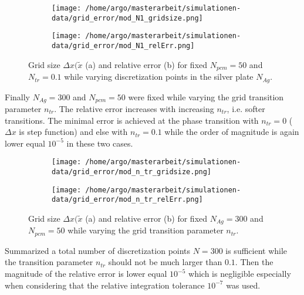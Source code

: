 \documentclass{scrartcl}[12pt, halfparskip]
\numberwithin{equation}{section}
\numberwithin{figure}{section}
\numberwithin{table}{section}
\begin{document}
\begin{figure}[H]
	\begin{subfigure}{0.49\textwidth}
		\texttt{[image: /home/argo/masterarbeit/simulationen-data/grid\_error/mod\_N1\_gridsize.png]}
		\caption{}
		\label{fig:gridsize_mod_N1}
	\end{subfigure}
	\begin{subfigure}{0.49\textwidth}
		\texttt{[image: /home/argo/masterarbeit/simulationen-data/grid\_error/mod\_N1\_relErr.png]}
		\caption{}
		\label{fig:grid_relErr_mod_N1}
	\end{subfigure}
	\caption{Grid size $\Delta x(\tilde{x}$ (a) and relative error (b) for fixed $N_{pcm}=50$ and $N_{tr}=0.1$ while varying discretization points in the silver plate $N_{Ag}$.}
	\label{fig:grid_mod_N1}
\end{figure}


Finally $N_{Ag}=300$ and $N_{pcm}=50$ were fixed while varying the grid transition parameter $n_{tr}$. The relative error increases with increasing $n_{tr}$, i.e. softer transitions. The minimal error is achieved at the phase transition with $n_{tr}=0$ ($\Delta x$ is step function) and else with $n_{tr}=0.1$ while the order of magnitude is again lower equal $10^{-5}$ in these two cases.

\begin{figure}[H]
	\begin{subfigure}{0.49\textwidth}
		\texttt{[image: /home/argo/masterarbeit/simulationen-data/grid\_error/mod\_n\_tr\_gridsize.png]}
		\caption{}
		\label{fig:gridsize_mod_n_tr}
	\end{subfigure}
	\begin{subfigure}{0.49\textwidth}
		\texttt{[image: /home/argo/masterarbeit/simulationen-data/grid\_error/mod\_n\_tr\_relErr.png]}
		\caption{}
		\label{fig:grid_relErr_mod_n_tr}
	\end{subfigure}
	\caption{Grid size $\Delta x(\tilde{x}$ (a) and relative error (b) for fixed $N_{Ag}=300$ and $N_{pcm}=50$ while varying the grid transition parameter $n_{tr}$.}
	\label{fig:grid_mod_n_tr}
\end{figure}

Summarized a total number of discretization points $N=300$ is sufficient while the transition parameter $n_{tr}$ should not be much larger than $0.1$. Then the magnitude of the relative error is lower equal $10^{-5}$ which is negligible especially when considering that the relative integration tolerance $10^{-7}$ was used.
\end{document}

